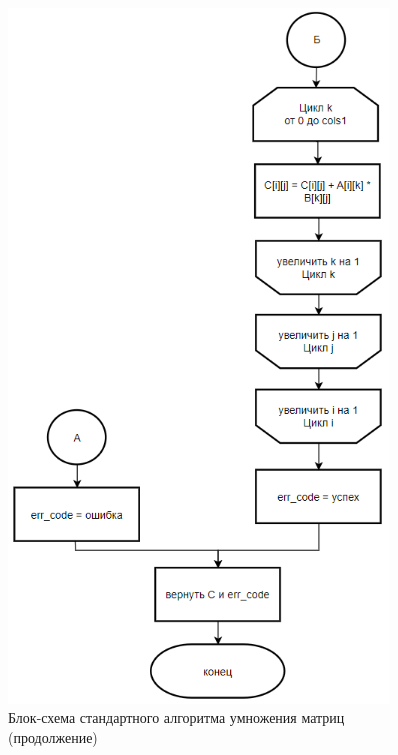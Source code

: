 \begin{figure}[H]
    \centering
    \includegraphics[width=0.9\textwidth]{img/block_1_2.png}
    \caption{Блок-схема стандартного алгоритма умножения матриц (продолжение)}
    \label{fig:block_1_2}
\end{figure}

